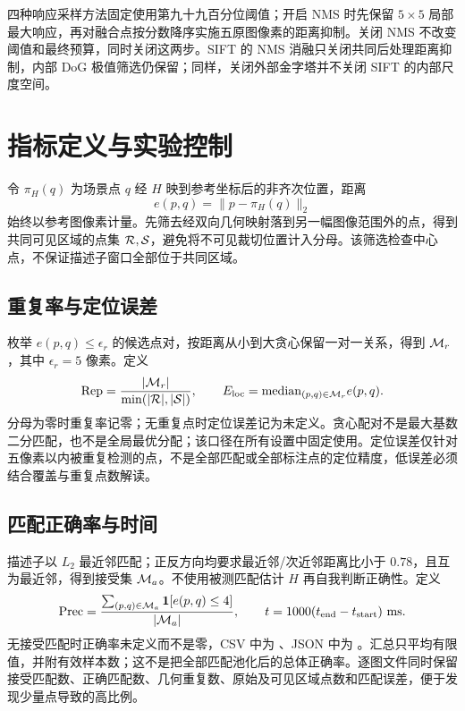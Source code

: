 四种响应采样方法固定使用第九十九百分位阈值；开启 NMS 时先保留 $5\times5$ 局部最大响应，再对融合点按分数降序实施五原图像素的距离抑制。关闭 NMS 不改变阈值和最终预算，同时关闭这两步。SIFT 的 NMS 消融只关闭共同后处理距离抑制，内部 DoG 极值筛选仍保留；同样，关闭外部金字塔并不关闭 SIFT 的内部尺度空间。

\section{指标定义与实验控制}
令 $\pi_H(q)$ 为场景点 $q$ 经 $H$ 映到参考坐标后的非齐次位置，距离
\begin{equation}
e(p,q)=\|p-\pi_H(q)\|_2
\end{equation}
始终以参考图像素计量。先筛去经双向几何映射落到另一幅图像范围外的点，得到共同可见区域的点集 $\mathcal{R},\mathcal{S}$，避免将不可见裁切位置计入分母。该筛选检查中心点，不保证描述子窗口全部位于共同区域。

\subsection{重复率与定位误差}
枚举 $e(p,q)\leq\epsilon_r$ 的候选点对，按距离从小到大贪心保留一对一关系，得到 $\mathcal{M}_r$，其中 $\epsilon_r=5$ 像素。定义
\begin{equation}
\mathrm{Rep}=\frac{|\mathcal{M}_r|}{\min(|\mathcal{R}|,|\mathcal{S}|)},\qquad
E_{\mathrm{loc}}=\mathrm{median}_{(p,q)\in\mathcal{M}_r}e(p,q).
\end{equation}
分母为零时重复率记零；无重复点时定位误差记为未定义。贪心配对不是最大基数二分匹配，也不是全局最优分配；该口径在所有设置中固定使用。定位误差仅针对五像素以内被重复检测的点，不是全部匹配或全部标注点的定位精度，低误差必须结合覆盖与重复点数解读。

\subsection{匹配正确率与时间}
描述子以 $L_2$ 最近邻匹配；正反方向均要求最近邻/次近邻距离比小于 $0.78$，且互为最近邻，得到接受集 $\mathcal{M}_a$。不使用被测匹配估计 $H$ 再自我判断正确性。定义
\begin{equation}
\mathrm{Prec}=\frac{\sum_{(p,q)\in\mathcal{M}_a}\mathbf{1}[e(p,q)\leq4]}{|\mathcal{M}_a|},\qquad
t=1000(t_{\mathrm{end}}-t_{\mathrm{start}})\ \mathrm{ms}.
\end{equation}
无接受匹配时正确率未定义而不是零，CSV 中为 、JSON 中为 。汇总只平均有限值，并附有效样本数；这不是把全部匹配池化后的总体正确率。逐图文件同时保留接受匹配数、正确匹配数、几何重复数、原始及可见区域点数和匹配误差，便于发现少量点导致的高比例。

